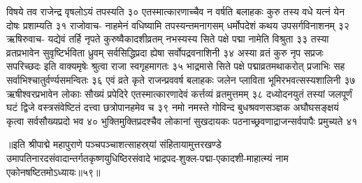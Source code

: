 विषये तव राजेन्द्र वृषलोऽयं तपस्यति ३०
एतस्मात्कारणाच्चैव न वर्षति बलाहकः 
कुरु तस्य वधे यत्नं येन दोषः प्रशाम्यति ३१
राजोवाच-
नाहमेनं वधिष्यामि तपस्यन्तमनागसम् 
धर्मोपदेशं कथय उपसर्गविनाशनम् ३२
ऋषिरुवाच-
यद्येवं तर्हि नृपते कुरुष्वैकादशीव्रतम् 
नभस्यस्य सिते पक्षे पद्मा नामेति विश्रुता ३३
तस्या व्रतप्रभावेन सुवृष्टिर्भविता ध्रुवम् 
सर्वसिद्धिप्रदा ह्येषा सर्वोपद्रवनाशिनी ३४
अस्या व्रतं कुरु नृप सप्रजः सपरिच्छदः 
इति वाक्यमृषेः श्रुत्वा राजा स्वगृहमागतः ३५
भाद्रमासे सिते पक्षे पद्माव्रतमथाकरोत् 
प्रजाभिः सह सर्वाभिश्चातुर्वर्ण्यसमन्वितः ३६
एवं व्रते कृते राजन्प्रववर्ष बलाहकः 
जलेन प्लाविता भूमिरभवत्सस्यशालिनी ३७
ऋषीश्वरप्रभावेन लोकाः सौख्यं प्रपेदिरे 
एतस्मात्कारणादेवं कर्त्तव्यं व्रतमुत्तमम् ३८
दध्योदनयुतं तस्यां जलपूर्णं घटं द्विजे 
वस्त्रसंवेष्टितं दत्त्वा छत्रोपानहमेव च ३९
नमो नमस्ते गोविन्द बुधश्रवणसञ्ज्ञक 
अघौघसङ्क्षयं कृत्वा सर्वसौख्यप्रदो भव ४०
भुक्तिमुक्तिप्रदश्चैव लोकानां सुखदायकः 
पठनाच्छ्रवणाद्राजन्सर्वपापैः प्रमुच्यते ४१

॥इति श्रीपाद्मे महापुराणे पञ्चपञ्चाशत्साहस्र्यां संहितायामुत्तरखण्डे उमापतिनारदसंवादान्तर्गतकृष्णयुधिष्ठिरसंवादे भाद्रपद-शुक्ल-पद्मा-एकादशी-माहात्म्यं नाम एकोनषष्टितमोऽध्यायः॥५९॥



